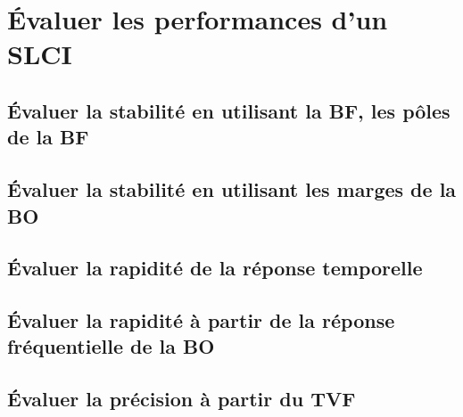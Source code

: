 \graphicspath{{\repStyle/png/}{../SLCI/SLCI-11-DiagrammeBode/511_Divers/images/}} 
 
 
\setchapterpreamble[u]{\margintoc} 
\chapter{Évaluer les performances d'un SLCI} 
\section{Évaluer la stabilité en utilisant la BF, les pôles de la BF} 
\section{Évaluer la stabilité en utilisant les marges de la BO} 
\graphicspath{{\repStyle/png/}{../PERF/PERF-02-Marges/61_Hemostase/images/}} 
 
 
\graphicspath{{\repStyle/png/}{../PERF/PERF-02-Marges/62_Palettisation/images/}} 
 
 
\graphicspath{{\repStyle/png/}{../PERF/PERF-02-Marges/63_BancHydraulique/images/}} 
 
 
\graphicspath{{\repStyle/png/}{../PERF/PERF-02-Marges/64_EPAS/images/}} 
 
 
\section{Évaluer la rapidité de la réponse temporelle} 
\section{Évaluer la rapidité à partir de la réponse fréquentielle de la BO} 
\section{Évaluer la précision à partir du TVF} 
\graphicspath{{\repStyle/png/}{../PERF/PERF-05-Precistion-TVF/501_Divers/images/}} 
 
 
\graphicspath{{\repStyle/png/}{../PERF/PERF-05-Precistion-TVF/509_Divers/images/}} 
 
 

